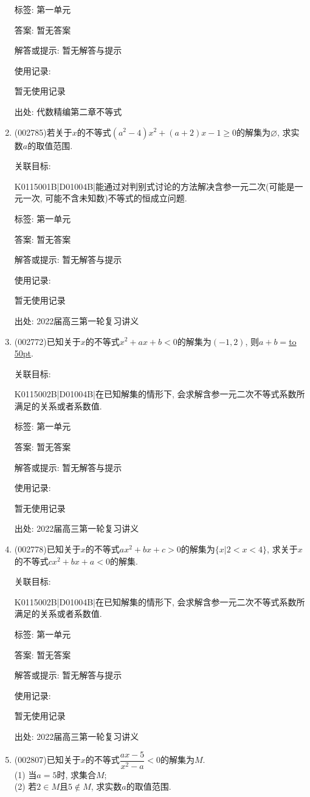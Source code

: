 \documentclass[10pt,a4paper]{article}
\newcommand{\blank}[1]{\underline{\hbox to #1pt{}}}
\begin{document}
\begin{enumerate}[1.]
标签: 第一单元

答案: 暂无答案

解答或提示: 暂无解答与提示

使用记录:

暂无使用记录


出处: 代数精编第二章不等式
\item { (002785)}若关于$x$的不等式$(a^2-4)x^2+(a+2)x-1\ge 0$的解集为$\varnothing$, 求实数$a$的取值范围.


关联目标:

K0115001B|D01004B|能通过对判别式讨论的方法解决含参一元二次(可能是一元一次, 可能不含未知数)不等式的恒成立问题.



标签: 第一单元

答案: 暂无答案

解答或提示: 暂无解答与提示

使用记录:

暂无使用记录


出处: 2022届高三第一轮复习讲义
\item { (002772)}已知关于$x$的不等式$x^2+ax+b<0$的解集为$(-1,2)$, 则$a+b=$\blank{50}.


关联目标:

K0115002B|D01004B|在已知解集的情形下, 会求解含参一元二次不等式系数所满足的关系或者系数值.



标签: 第一单元

答案: 暂无答案

解答或提示: 暂无解答与提示

使用记录:

暂无使用记录


出处: 2022届高三第一轮复习讲义
\item { (002778)}已知关于$x$的不等式$ax^2+bx+c>0$的解集为$\{x|2<x<4\}$, 求关于$x$的不等式$cx^2+bx+a<0$的解集.


关联目标:

K0115002B|D01004B|在已知解集的情形下, 会求解含参一元二次不等式系数所满足的关系或者系数值.



标签: 第一单元

答案: 暂无答案

解答或提示: 暂无解答与提示

使用记录:

暂无使用记录


出处: 2022届高三第一轮复习讲义
\item { (002807)}已知关于$x$的不等式$\dfrac{ax-5}{x^2-a}<0$的解集为$M$.\\
(1) 当$a=5$时, 求集合$M$;\\
(2) 若$2\in M$且$5\notin M$, 求实数$a$的取值范围.



\end{enumerate}
\end{document}
